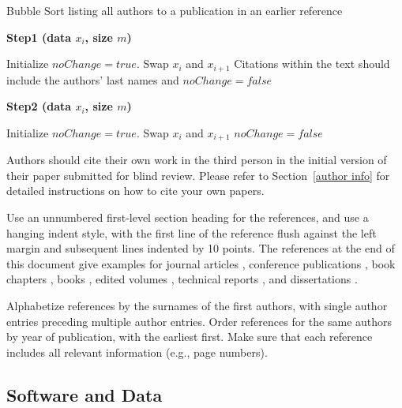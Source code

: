 \documentclass{article}
\begin{document}
\begin{algorithm}[tb]
   \caption{Bubble Sort listing all authors to a publication in an earlier reference}
   \label{alg:example}
{\bfseries Step1 (data $x_i$, size $m$)}
\begin{algorithmic}[1]
   \REPEAT
   \STATE Initialize $noChange = true$.
   \STATE Swap $x_i$ and $x_{i+1}$ Citations within the text should include the authors' last names and
   \STATE $noChange = false$
   \ENDIF
   \ENDFOR
\end{algorithmic}
{\bfseries Step2 (data $x_i$, size $m$)}
\begin{algorithmic}[1]
   \REPEAT
   \STATE Initialize $noChange = true$.
   \STATE Swap $x_i$ and $x_{i+1}$
   \STATE $noChange = false$
   \ENDIF
   \ENDFOR
\end{algorithmic}
\end{algorithm}


Authors should cite their own work in the third person
in the initial version of their paper submitted for blind review.
Please refer to Section~\ref{author info} for detailed instructions on how to
cite your own papers.

Use an unnumbered first-level section heading for the references, and
use a hanging indent style, with the first line of the reference flush
against the left margin and subsequent lines indented by 10 points.
The references at the end of this document give examples for journal
articles \cite{Samuel59}, conference publications \cite{langley00}, book chapters \cite{Newell81}, books \cite{DudaHart2nd}, edited volumes \cite{MachineLearningI},
technical reports \cite{mitchell80}, and dissertations \cite{kearns89}.

Alphabetize references by the surnames of the first authors, with
single author entries preceding multiple author entries. Order
references for the same authors by year of publication, with the
earliest first. Make sure that each reference includes all relevant
information (e.g., page numbers).

\subsection{Software and Data}
\end{document}
